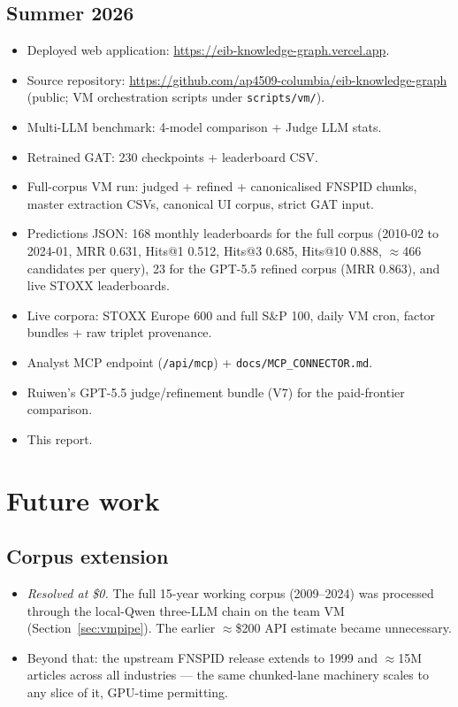 \documentclass[11pt]{article}
\begin{document}
\subsection{Summer 2026}
\begin{itemize}
  \item Deployed web application: \url{https://eib-knowledge-graph.vercel.app}.
  \item Source repository: \url{https://github.com/ap4509-columbia/eib-knowledge-graph} (public; VM orchestration scripts under \texttt{scripts/vm/}).
  \item Multi-LLM benchmark: 4-model comparison + Judge LLM stats.
  \item Retrained GAT: 230 checkpoints + leaderboard CSV.
  \item Full-corpus VM run: judged + refined + canonicalised FNSPID chunks, master extraction CSVs, canonical UI corpus, strict GAT input.
  \item Predictions JSON: 168 monthly leaderboards for the full corpus (2010-02 to 2024-01, MRR 0.631, Hits@1 0.512, Hits@3 0.685, Hits@10 0.888, \(\approx\)466 candidates per query), 23 for the GPT-5.5 refined corpus (MRR 0.863), and live STOXX leaderboards.
  \item Live corpora: STOXX Europe 600 and full S\&P 100, daily VM cron, factor bundles + raw triplet provenance.
  \item Analyst MCP endpoint (\texttt{/api/mcp}) + \texttt{docs/MCP\_CONNECTOR.md}.
  \item Ruiwen's GPT-5.5 judge/refinement bundle (V7) for the paid-frontier comparison.
  \item This report.
\end{itemize}

\section{Future work}

\subsection{Corpus extension}
\begin{itemize}
  \item \emph{Resolved at \$0.} The full 15-year working corpus (2009--2024) was processed through the local-Qwen three-LLM chain on the team VM (Section~\ref{sec:vmpipe}). The earlier \(\approx\)\$200 API estimate became unnecessary.
  \item Beyond that: the upstream FNSPID release extends to 1999 and \(\approx\)15M articles across all industries --- the same chunked-lane machinery scales to any slice of it, GPU-time permitting.
\end{itemize}
\end{document}
